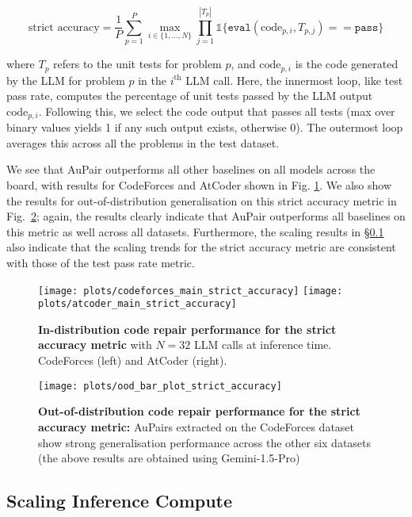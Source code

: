 \documentclass[11pt, a4paper, logo, copyright]{googledeepmind}
\def\aupair/{\textcolor{golden}{Au}Pair}
\def\aupairs/{\textcolor{golden}{Au}Pairs}
\begin{document}
$$\text{strict accuracy} = \frac{1}{P}\sum_{p=1}^{P}\max_{i \in \{1, \ldots, N\}} \prod_{j=1}^{|T_p|} \mathbb{1} \{ \texttt{eval}(\text{code}_{p, i}, T_{p, j}) == \texttt{pass} \}$$

where $T_p$ refers to the unit tests for problem $p$, and $\text{code}_{p, i}$ is the code generated by the LLM for problem $p$ in the $i^{\text{th}}$ LLM call. Here, the innermost loop, like test pass rate, computes the percentage of unit tests passed by the LLM output $\text{code}_{p, i}$. Following this, we select the code output that passes all tests (max over binary values yields 1 if any such output exists, otherwise 0). The outermost loop averages this across all the problems in the test dataset. 

We see that \aupair/ outperforms all other baselines on all models across the board, with results for CodeForces and AtCoder shown in Fig. \ref{fig:strict_accuracy_results}. We also show the results for out-of-distribution generalisation on this strict accuracy metric in Fig.~\ref{fig:ood_generalisation_strict_accuracy}; again, the results clearly indicate that \aupair/ outperforms all baselines on this metric as well across all datasets. Furthermore, the scaling results in \S\ref{sec:inference_compute_scaling_flash} also indicate that the scaling trends for the strict accuracy metric are consistent with those of the test pass rate metric.

\begin{figure}[t]
    \centering
    \texttt{[image: plots/codeforces\_main\_strict\_accuracy]}
    \texttt{[image: plots/atcoder\_main\_strict\_accuracy]}
    \caption{\textbf{In-distribution code repair performance for the strict accuracy metric} with $N = 32$ LLM calls at inference time. CodeForces (left) and AtCoder (right).}
    \label{fig:strict_accuracy_results}
\end{figure}

\begin{figure}[t]
    \centering
        \texttt{[image: plots/ood\_bar\_plot\_strict\_accuracy]}
        \caption{\textbf{Out-of-distribution code repair performance for the strict accuracy metric:} \aupairs/ extracted on the CodeForces dataset show strong generalisation performance across the other six datasets (the above results are obtained using Gemini-1.5-Pro)}
        \label{fig:ood_generalisation_strict_accuracy}
\end{figure}


\subsection{Scaling Inference Compute}\label{sec:inference_compute_scaling_flash}
\end{document}
